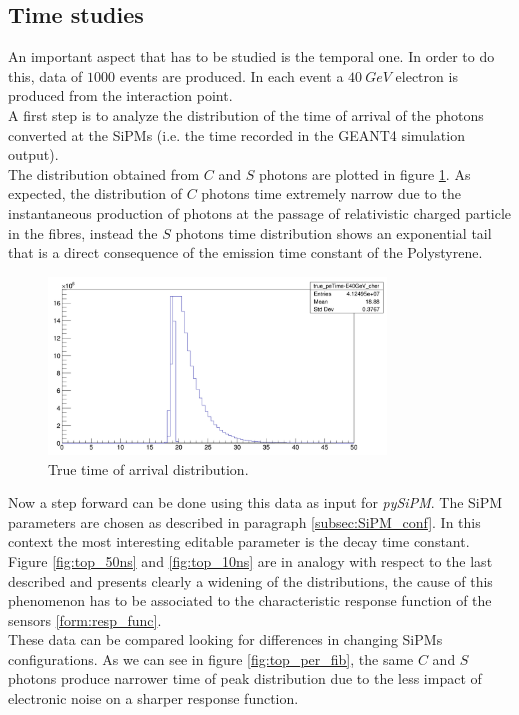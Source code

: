 \subsection{Time studies} \label{subsec:Time}
An important aspect that has to be studied is the temporal one.
In order to do this, data of $1000$ events are produced. In each event a $40\ GeV$ electron is produced from the interaction point.\\
A first step is to analyze the distribution of the time of arrival of the photons converted at the SiPMs (i.e. the time recorded in the GEANT4 simulation output).\\
The distribution obtained from $C$ and $S$ photons are plotted in figure \ref{fig:true_toa_dist}.
As expected, the distribution of $C$ photons time extremely narrow due to the instantaneous production of photons at the passage of relativistic charged particle in the fibres, instead the $S$ photons time distribution shows an exponential tail that is a direct consequence of the emission time constant of the Polystyrene.\\

\begin{figure}
	\centering
	\includegraphics[width=0.8\textwidth]{IMG/true_toa_dist}
	\caption{True time of arrival distribution.}
	\label{fig:true_toa_dist}
\end{figure}

Now a step forward can be done using this data as input for \textit{pySiPM}. The SiPM parameters are chosen as described in paragraph \ref{subsec:SiPM_conf}. In this context the most interesting editable parameter is the decay time constant.\\ 
Figure \ref{fig:top_50ns} and \ref{fig:top_10ns} are in analogy with respect to the last described and presents clearly a widening of the distributions, the cause of this phenomenon has to be associated to the characteristic response function of the sensors \ref{form:resp_func}.\\
These data can be compared looking for differences in changing SiPMs configurations. As we can see in figure \ref{fig:top_per_fib}, the same $C$ and $S$ photons produce narrower time of peak distribution due to the less impact of electronic noise on a sharper response function.\\


